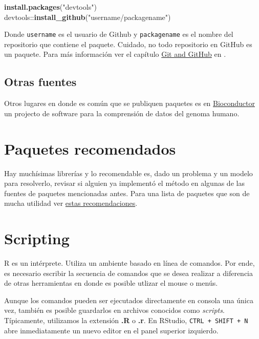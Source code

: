 \documentclass[]{article}
\newenvironment{Shaded}{\begin{snugshade}}{\end{snugshade}}
\newcommand{\KeywordTok}[1]{\textcolor[rgb]{0.13,0.29,0.53}{\textbf{{#1}}}}
\newcommand{\StringTok}[1]{\textcolor[rgb]{0.31,0.60,0.02}{{#1}}}
\newcommand{\NormalTok}[1]{{#1}}
\begin{document}
\begin{Shaded}
\begin{Highlighting}[]
\KeywordTok{install.packages}\NormalTok{(}\StringTok{"devtools"}\NormalTok{)}
\NormalTok{devtools::}\KeywordTok{install_github}\NormalTok{(}\StringTok{"username/packagename"}\NormalTok{)}
\end{Highlighting}
\end{Shaded}

Donde \texttt{username} es el usuario de Github y \texttt{packagename}
es el nombre del repositorio que contiene el paquete. Cuidado, no todo
repositorio en GitHub es un paquete. Para más información ver el
capítulo \href{http://r-pkgs.had.co.nz/git.html}{Git and GitHub} en
\textcite{wickham2015r}.

\subsection{Otras fuentes}\label{otras-fuentes}

Otros lugares en donde es común que se publiquen paquetes es en
\href{https://www.bioconductor.org/}{Bioconductor} un projecto de
software para la comprensión de datos del genoma humano.

\section{Paquetes recomendados}\label{paquetes-recomendados}

Hay muchísimas librerías y lo recomendable es, dado un problema y un
modelo para resolverlo, revisar si alguien ya implementó el método en
algunas de las fuentes de paquetes mencionadas antes. Para una lista de
paquetes que son de mucha utilidad ver
\href{https://github.com/Skalas/massive-adventure-ubuntu/blob/master/Rpackages/data_manipulation.R}{estas
recomendaciones}.

\section{Scripting}\label{scripting}

R es un intérprete. Utiliza un ambiente basado en línea de comandos. Por
ende, es necesario escribir la secuencia de comandos que se desea
realizar a diferencia de otras herramientas en donde es posible utlizar
el mouse o menús.

Aunque los comandos pueden ser ejecutados directamente en consola una
única vez, también es posible guardarlos en archivos conocidos como
\emph{scripts}. Típicamente, utilizamos la extensión \textbf{.R} o
\textbf{.r}. En RStudio, \texttt{CTRL\ +\ SHIFT\ +\ N} abre
inmediatamente un nuevo editor en el panel superior izquierdo.
\end{document}
